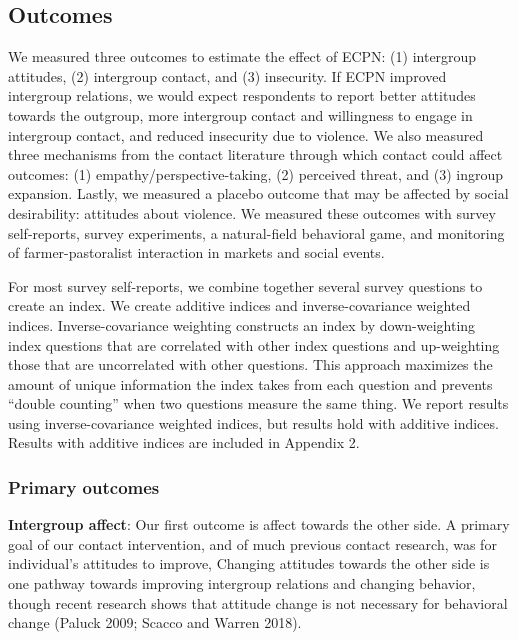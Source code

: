 \documentclass[11pt]{article}
\begin{document}
\hypertarget{outcomes}{%
\subsection{Outcomes}\label{outcomes}}

We measured three outcomes to estimate the effect of ECPN: (1)
intergroup attitudes, (2) intergroup contact, and (3) insecurity. If
ECPN improved intergroup relations, we would expect respondents to
report better attitudes towards the outgroup, more intergroup contact
and willingness to engage in intergroup contact, and reduced insecurity
due to violence. We also measured three mechanisms from the contact
literature through which contact could affect outcomes: (1)
empathy/perspective-taking, (2) perceived threat, and (3) ingroup
expansion. Lastly, we measured a placebo outcome that may be affected by
social desirability: attitudes about violence. We measured these
outcomes with survey self-reports, survey experiments, a natural-field
behavioral game, and monitoring of farmer-pastoralist interaction in
markets and social events.

For most survey self-reports, we combine together several survey
questions to create an index. We create additive indices and
inverse-covariance weighted indices. Inverse-covariance weighting
constructs an index by down-weighting index questions that are
correlated with other index questions and up-weighting those that are
uncorrelated with other questions. This approach maximizes the amount of
unique information the index takes from each question and prevents
``double counting'' when two questions measure the same thing. We report
results using inverse-covariance weighted indices, but results hold with
additive indices. Results with additive indices are included in Appendix
2.

\hypertarget{primary-outcomes}{%
\subsubsection{Primary outcomes}\label{primary-outcomes}}

\textbf{Intergroup affect}: Our first outcome is affect towards the
other side. A primary goal of our contact intervention, and of much
previous contact research, was for individual's attitudes to improve,
Changing attitudes towards the other side is one pathway towards
improving intergroup relations and changing behavior, though recent
research shows that attitude change is not necessary for behavioral
change (Paluck 2009; Scacco and Warren 2018).
\end{document}
